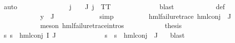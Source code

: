 \begin{isabellebody}
\ auto\isanewline
\ \ \ \ \ \ \ \ \isamarkupfalse%
\ {\isachardoublequoteopen}{\isasymPsi}\ {\isacharbackquote}{\kern0pt}\ {\isacharbraceleft}{\kern0pt}{\isacharbraceright}{\kern0pt}\ {\isacharequal}{\kern0pt}\ {\isacharbraceleft}{\kern0pt}{\isacharbraceright}{\kern0pt}{\isachardoublequoteclose}\ {\isachardoublequoteopen}{\isasymforall}j\ {\isasymin}\ {\isasymPsi}\ {\isacharbackquote}{\kern0pt}\ J{\isachardot}{\kern0pt}\ j\ {\isacharequal}{\kern0pt}\ TT{\isachardoublequoteclose}\ \isanewline
\ \ \ \ \ \ \ \ \ \ \ \isamarkupfalse%
\ blast\isanewline
\ \ \ \ \ \ \ \ \ \ \isamarkupfalse%
\ {\isasymPsi}{\isacharunderscore}{\kern0pt}def\ \isanewline
\ \ \ \ \ \ \ \ \ \ \isamarkupfalse%
\ {\isacartoucheopen}y\ {\isasymin}\ {\isasymPhi}{\isacharbackquote}{\kern0pt}J{\isacartoucheclose}\ \isanewline
\ \ \ \ \ \ \ \ \ \ \isamarkupfalse%
\ simp\isanewline
\ \ \ \ \ \ \ \ \isamarkupfalse%
\ {\isachardoublequoteopen}hml{\isacharunderscore}{\kern0pt}failure{\isacharunderscore}{\kern0pt}trace\ {\isacharparenleft}{\kern0pt}hml{\isacharunderscore}{\kern0pt}conj\ {\isacharbraceleft}{\kern0pt}{\isacharbraceright}{\kern0pt}\ J\ {\isasymPsi}{\isacharparenright}{\kern0pt}{\isachardoublequoteclose}\ \isanewline
\ \ \ \ \ \ \ \ \ \ \isamarkupfalse%
\ {\isacharparenleft}{\kern0pt}meson\ hml{\isacharunderscore}{\kern0pt}failure{\isacharunderscore}{\kern0pt}trace{\isachardot}{\kern0pt}intros{\isacharparenleft}{\kern0pt}{}{\isacharparenright}{\kern0pt}{\isacharparenright}{\kern0pt}\isanewline
\ \ \ \ \ \ \ \ \isamarkupfalse%
\ \isamarkupfalse%
\ {\isacharquery}{\kern0pt}thesis\ \isamarkupfalse%
\ {\isacartoucheopen}{\isasymforall}s{\isachardot}{\kern0pt}\ {\isasymnot}s\ {\isasymTurnstile}\ {\isacharparenleft}{\kern0pt}hml{\isacharunderscore}{\kern0pt}conj\ I\ J\ {\isasymPhi}{\isacharparenright}{\kern0pt}{\isacartoucheclose}\ \isanewline
\ \ \ \ \ \ \ \ \ \ \isamarkupfalse%
\ {\isacartoucheopen}{\isasymforall}s{\isachardot}{\kern0pt}\ {\isasymnot}\ s\ {\isasymTurnstile}\ hml{\isacharunderscore}{\kern0pt}conj\ {\isacharbraceleft}{\kern0pt}{\isacharbraceright}{\kern0pt}\ J\ {\isasymPsi}{\isacartoucheclose}\ \isamarkupfalse%
\ blast\isanewline
\ \ \ \ \ \ \isamarkupfalse%
\isanewline
\ \ \ \ \isamarkupfalse%
\isanewline
\ \ \isamarkupfalse%
\ \isanewline
{}\isamarkupfalse%
%
\endisatagvisible
{\isafoldvisible}%
%
\isadelimvisible
\isanewline
%
\endisadelimvisible
{}\isamarkupfalse%
\isanewline
%
\isadelimtheory
%
\endisadelimtheory
%
\isatagtheory
{}\isamarkupfalse%
%
\endisatagtheory
{\isafoldtheory}%
%
\isadelimtheory
%
\endisadelimtheory
%
\end{isabellebody}%
